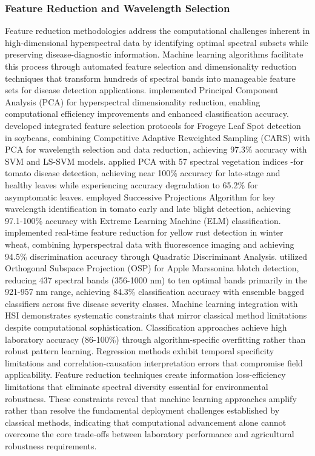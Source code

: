 \documentclass[sn-mathphys]{sn-jnl}
\theoremstyle{thmstyleone}%
\theoremstyle{thmstyletwo}%
\theoremstyle{thmstylethree}%
\begin{document}
\subsubsection{Feature Reduction and Wavelength Selection}
Feature reduction methodologies address the computational challenges inherent in high-dimensional hyperspectral data by identifying optimal spectral subsets while preserving disease-diagnostic information. Machine learning algorithms facilitate this process through automated feature selection and dimensionality reduction techniques that transform hundreds of spectral bands into manageable feature sets for disease detection applications.
\citet{zhao2020identification} implemented Principal Component Analysis (PCA) for hyperspectral dimensionality reduction, enabling computational efficiency improvements and enhanced classification accuracy. \citet{liu2021classification} developed integrated feature selection protocols for Frogeye Leaf Spot detection in soybeans, combining Competitive Adaptive Reweighted Sampling (CARS) with PCA for wavelength selection and data reduction, achieving 97.3\% accuracy with SVM and LS-SVM models. \citet{lu2018detection} applied PCA with 57 spectral vegetation indices -for tomato disease detection, achieving near 100\% accuracy for late-stage and healthy leaves while experiencing accuracy degradation to 65.2\% for asymptomatic leaves. \citet{xie2015detection} employed Successive Projections Algorithm for key wavelength identification in tomato early and late blight detection, achieving 97.1-100\% accuracy with Extreme Learning Machine (ELM) classification. \citet{MOSHOU200575} implemented real-time feature reduction for yellow rust detection in winter wheat, combining hyperspectral data with fluorescence imaging and achieving 94.5\% discrimination accuracy through Quadratic Discriminant Analysis. \citet{shuaibu2018unsupervised} utilized Orthogonal Subspace Projection (OSP) for Apple Marssonina blotch detection, reducing 437 spectral bands (356-1000 nm) to ten optimal bands primarily in the 921-957 nm range, achieving 84.3\% classification accuracy with ensemble bagged classifiers across five disease severity classes.
Machine learning integration with HSI demonstrates systematic constraints that mirror classical method limitations despite computational sophistication. Classification approaches achieve high laboratory accuracy (86-100\%) through algorithm-specific overfitting rather than robust pattern learning. Regression methods exhibit temporal specificity limitations and correlation-causation interpretation errors that compromise field applicability. Feature reduction techniques create information loss-efficiency limitations that eliminate spectral diversity essential for environmental robustness. These constraints reveal that machine learning approaches amplify rather than resolve the fundamental deployment challenges established by classical methods, indicating that computational advancement alone cannot overcome the core trade-offs between laboratory performance and agricultural robustness requirements.
\end{document}
